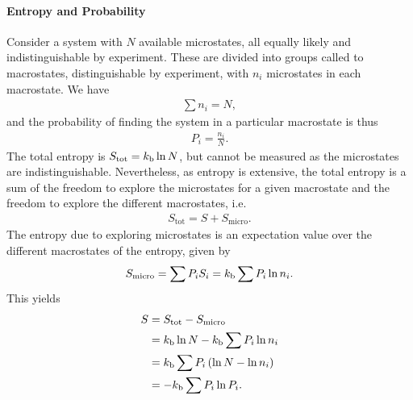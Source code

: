 \paragraph{Entropy and Probability}
Consider a system with $N$ available microstates, all equally likely and indistinguishable by experiment. These are divided into groups called to macrostates, distinguishable by experiment, with $n_{i}$ microstates in each macrostate. We have
\begin{align*}
	\sum n_{i} = N,
\end{align*}
and the probability of finding the system in a particular macrostate is thus
\begin{align*}
	P_{i} = \frac{n_{i}}{N}.
\end{align*}
The total entropy is $S_{\text{tot}} = k_{\text{b}}\ln{N}$, but cannot be measured as the microstates are indistinguishable. Nevertheless, as entropy is extensive, the total entropy is a sum of the freedom to explore the microstates for a given macrostate and the freedom to explore the different macrostates, i.e.
\begin{align*}
	S_{\text{tot}} = S + S_{\text{micro}}.
\end{align*}
The entropy due to exploring microstates is an expectation value over the different macrostates of the entropy, given by
\begin{align*}
	S_{\text{micro}} = \sum P_{i}S_{i} = k_{\text{b}}\sum P_{i}\ln{n_{i}}.
\end{align*}
This yields
\begin{align*}
	S &= S_{\text{tot}} - S_{\text{micro}} \\
	  &= k_{\text{b}}\ln{N} - k_{\text{b}}\sum P_{i}\ln{n_{i}} \\
	  &= k_{\text{b}}\sum P_{i}\left(\ln{N} - \ln{n_{i}}\right) \\
	  &= -k_{\text{b}}\sum P_{i}\ln{P_{i}}.
\end{align*}
